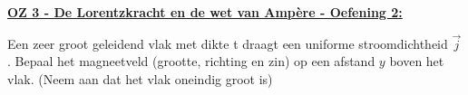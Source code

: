 \textbf{\underline{OZ 3 - De Lorentzkracht en de wet van Ampère - Oefening 2:}}
\vspace{0.5cm}


Een zeer groot geleidend vlak met dikte t draagt een uniforme stroomdichtheid $\Vec{j}$. Bepaal het magneetveld (grootte, richting en zin) op een afstand $y$ boven het vlak. (Neem aan dat het vlak oneindig groot is)


